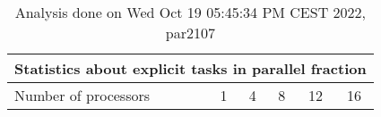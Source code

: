 \begin{table}[h]
\begin{center}
\begin{tabular}{|l|c|c|c|c|c|}
\hline
\multicolumn{6}{|c|}{Statistics about explicit tasks in parallel fraction} \\
\hline
\hline
Number of processors & 1 & 4 & 8 & 12 & 16 \\
\hline
\hline
\end{tabular}
\end{center}
\caption{ Analysis done on Wed Oct 19 05:45:34 PM CEST 2022, par2107}
\end{table}
